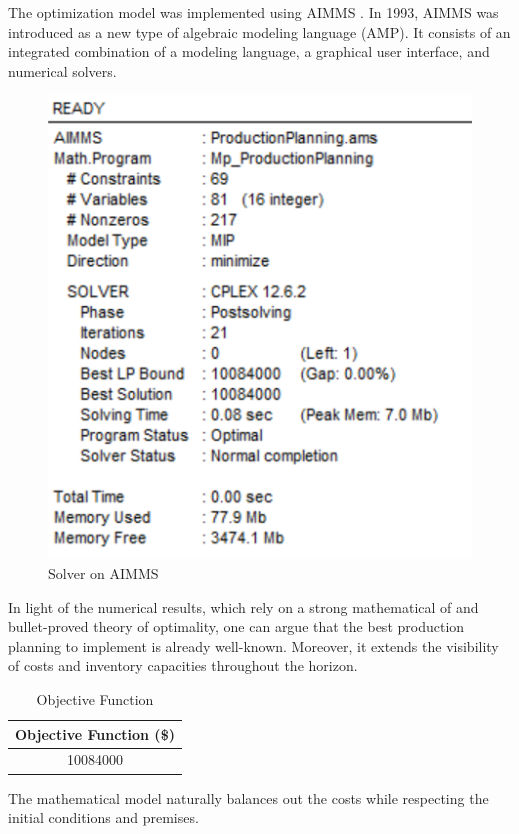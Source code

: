 \documentclass[a4paper,12pt]{article}
\begin{document}
The optimization model was implemented using AIMMS \cite{aimms}. In 1993, AIMMS was introduced as a new type of algebraic modeling language (AMP). It consists of an integrated combination of a modeling language, a graphical user interface, and numerical solvers.\\


\begin{figure}[H]
\centering
\includegraphics[scale=0.5]{1.png}
\caption{Solver on AIMMS}
\end{figure}

In light of the numerical results, which rely on a strong mathematical of and bullet-proved theory of optimality, one can argue that the best production planning to implement is already well-known. Moreover, it extends the visibility of costs and inventory capacities throughout the horizon. 

\begin{table}[H]
\centering
\begin{tabular}{|c|}
\hline
\textbf{Objective Function (\$)}  \\
\hline
10084000 \\
\hline 
\end{tabular}
\caption{Objective Function}
\end{table}

The mathematical model naturally balances out the costs while respecting the initial conditions and premises.
\end{document}
